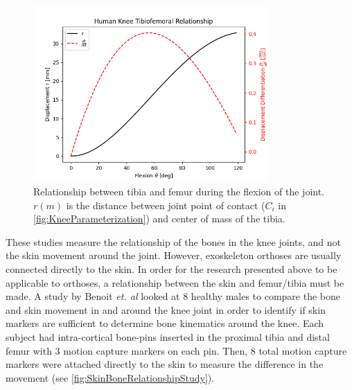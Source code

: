 \begin{figure}[ht!]
    \centering
    \includegraphics[width=0.8\textwidth]{Figures/Background/FlexionCurve.png}
    \caption{Relationship between tibia and femur during the flexion of the joint. \(r(m)\) is the distance between joint point of contact (\(C_i\) in \autoref{fig:KneeParameterization}) and center of mass of the tibia.}
    \label{fig:KneeFlexionCurve}
\end{figure}

These studies measure the relationship of the bones in the knee joints, and not the skin movement around the joint. However, exoskeleton orthoses are usually connected directly to the skin. In order for the research presented above to be applicable to orthoses, a relationship between the skin and femur/tibia must be made. A study by Benoit \textit{et. al} looked at 8 healthy males to compare the bone and skin movement in and around the knee joint in order to identify if skin markers are sufficient to determine bone kinematics around the knee. Each subject had intra-cortical bone-pins inserted in the proximal tibia and distal femur with 3 motion capture markers on each pin. Then, 8 total motion capture markers were attached directly to the skin to measure the difference in the movement (see \autoref{fig:SkinBoneRelationshipStudy}). 

